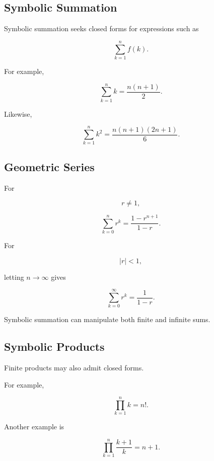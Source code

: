 \subsection{Symbolic Summation}
\label{subsec:symbolic-summation}

Symbolic summation seeks closed forms for expressions such as

\[
\boxed{
\sum_{k=1}^{n}
f(k).
}
\]

For example,

\[
\boxed{
\sum_{k=1}^{n}
k
=
\frac{
n(n+1)
}{
2
}.
}
\]

Likewise,

\[
\boxed{
\sum_{k=1}^{n}
k^2
=
\frac{
n(n+1)(2n+1)
}{
6
}.
}
\]

\subsection{Geometric Series}
\label{subsec:symbolic-geometric-series}

For

\[
r\neq1,
\]

\[
\boxed{
\sum_{k=0}^{n}
r^k
=
\frac{
1-r^{n+1}
}{
1-r
}.
}
\]

For

\[
|r|<1,
\]

letting \(n\to\infty\) gives

\[
\boxed{
\sum_{k=0}^{\infty}
r^k
=
\frac1{1-r}.
}
\]

Symbolic summation can manipulate both finite and infinite sums.

\subsection{Symbolic Products}
\label{subsec:symbolic-products}

Finite products may also admit closed forms.

For example,

\[
\boxed{
\prod_{k=1}^{n}
k
=
n!.
}
\]

Another example is

\[
\boxed{
\prod_{k=1}^{n}
\frac{k+1}{k}
=
n+1.
}
\]


